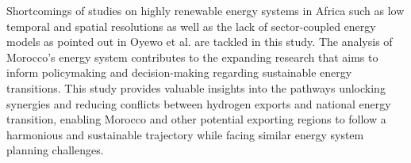 \documentclass[5p,numafflabel]{elsarticle}
\begin{document}
Shortcomings of studies on highly renewable energy systems in Africa such as low temporal and spatial resolutions as well as the lack of sector-coupled energy models as pointed out in Oyewo et al.\cite{Oyewo2023} are tackled in this study. The analysis of Morocco's energy system contributes to the expanding research that aims to inform policymaking and decision-making regarding sustainable energy transitions. This study provides valuable insights into the pathways unlocking synergies and reducing conflicts between hydrogen exports and national energy transition, enabling Morocco and other potential exporting regions to follow a harmonious and sustainable trajectory while facing similar energy system planning challenges.




\end{document}
